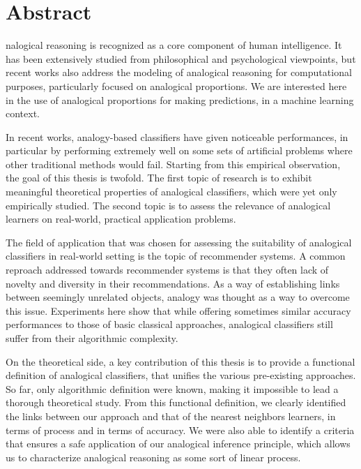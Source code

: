 \chapter*{Abstract}

nalogical reasoning is recognized as a core component of human
intelligence. It has been extensively studied from philosophical and
psychological viewpoints, but recent works also address the modeling of
analogical reasoning for computational purposes, particularly focused on
analogical proportions. We are interested here in the use of analogical
proportions for making predictions, in a machine learning context.

In recent works, analogy-based classifiers have given noticeable performances,
in particular by performing extremely well on some sets of artificial problems
where other traditional methods would fail. Starting from this empirical
observation, the goal of this thesis is twofold. The first topic of research is
to exhibit meaningful theoretical properties of analogical classifiers, which
were yet only empirically studied.  The second topic is to assess the relevance
of analogical learners on real-world, practical application problems.

The field of application that was chosen for assessing the suitability of
analogical classifiers in real-world setting is the topic of recommender
systems. A common reproach addressed towards recommender systems is that they
often lack of novelty and diversity in their recommendations. As a way of
establishing links between seemingly unrelated objects, analogy was thought as
a way to overcome this issue. Experiments here show that while offering
sometimes similar accuracy performances to those of basic classical approaches,
analogical classifiers still suffer from their algorithmic complexity.

On the theoretical side, a key contribution of this thesis is to provide a
functional definition of analogical classifiers, that unifies the various
pre-existing approaches. So far, only algorithmic definition were known, making
it impossible to lead a thorough theoretical study. From this functional
definition, we clearly identified the links between our approach and that of
the nearest neighbors learners, in terms of process and in terms of accuracy.
We were also able to identify a criteria that ensures a safe application of our
analogical inference principle, which allows us to characterize analogical
reasoning as some sort of linear process.
\newpage

